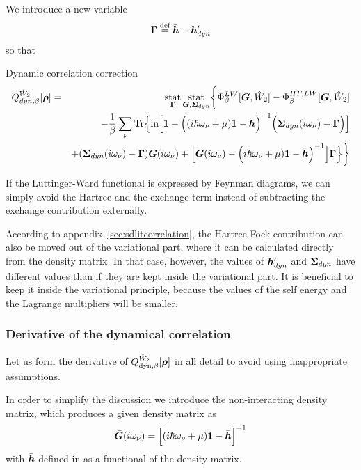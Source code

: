 \documentclass[11pt,a4paper]{report}
\begin{document}
We introduce a new variable
\begin{eqnarray}
\bm{\Gamma}\stackrel{\text{def}}{=}\bar{\bm{h}}-\bm{h}'_{dyn}
\end{eqnarray}
so that

\begin{myshadowminipage}{Dynamic correlation correction}
\begin{eqnarray}
Q^{\hat{W}_2}_{dyn,\beta}[\bm{\rho}]
&=&
\operatorname*{stat}_{\bm{\Gamma}}\operatorname*{stat}_{\bm{G},\bm{\Sigma}_{dyn}}
\biggl\lbrace
\Phi^{LW}_\beta[\bm{G},\hat{W}_2]-\Phi^{HF,LW}_\beta[\bm{G},\hat{W}_2]
\nonumber\\
&&-\frac{1}{\beta}\sum_\nu\mathrm{Tr}\Bigl\lbrace
\ln\Bigl[
\bm{1}-
\Bigl((i\hbar\omega_\nu+\mu)\bm{1}-\bar{\bm{h}}\Bigr)^{-1}
\Bigl(\bm{\Sigma}_{dyn}(i\omega_\nu)-\bm{\Gamma}\Bigr)
\Bigr]
\nonumber\\&&
+(\bm{\Sigma}_{dyn}(i\omega_\nu)-\bm{\Gamma})\bm{G}(i\omega_\nu)
+
\Bigl[
\bm{G}(i\omega_\nu)
-\Bigl(i\hbar\omega_\nu+\mu)\bm{1}-\bar{\bm{h}}\Bigr)^{-1}
\Bigr]
\bm{\Gamma}\Bigr\rbrace
\biggr\rbrace
\nonumber\\
\label{eq:dmf1green}
\end{eqnarray}
\end{myshadowminipage}

If the Luttinger-Ward functional is expressed by Feynman diagrams, we
can simply avoid the Hartree and the exchange term instead of
subtracting the exchange contribution externally. 

According to appendix~\ref{sec:sdlitcorrelation}, the Hartree-Fock
contribution can also be moved out of the variational part, where it
can be calculated directly from the density matrix. In that case,
however, the values of $\bm{h}'_{dyn}$ and $\bm{\Sigma}_{dyn}$ have
different values than if they are kept inside the variational part. It
is beneficial to keep it inside the variational principle, because the
values of the self energy and the Lagrange multipliers will be
smaller.

\subsubsection{Derivative of the dynamical correlation}
Let us form the derivative of
$Q_{\text{dyn},\beta}^{\hat{W}_2}[\bm{\rho}]$ in all detail to avoid
using inappropriate assumptions.

In order to simplify the discussion we introduce the non-interacting
density matrix, which produces a given density matrix as
\begin{eqnarray}
\bar{\bm{G}}(i\omega_\nu)
=\Bigl[(i\hbar\omega_\nu+\mu)\bm{1}-\bar{\bm{h}}\Bigr]^{-1}
\label{eq:defgbar}
\end{eqnarray}
with $\bar{\bm{h}}$ defined in  as a functional of the
density matrix.
\end{document}
